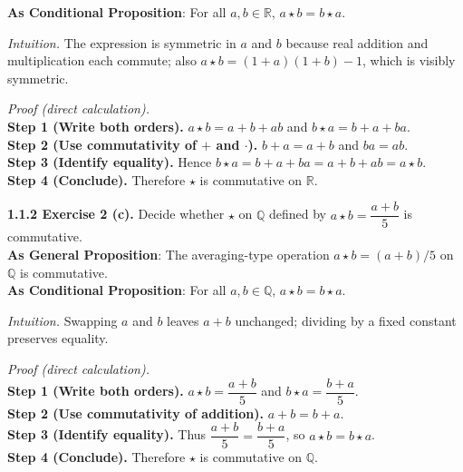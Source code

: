 \documentclass[12pt]{article}
\theoremstyle{definition}
\begin{document}
\noindent \textbf{As Conditional Proposition}: For all $a,b\in\mathbb{R}$, $a\star b=b\star a$.

\newpage

\dotfill

\emph{Intuition.} The expression is symmetric in $a$ and $b$ because real addition and multiplication each commute; also $a\star b=(1+a)(1+b)-1$, which is visibly symmetric.\\

\dotfill

\emph{Proof (direct calculation).}\\
\textbf{Step 1 (Write both orders).} $a\star b=a+b+ab$ and $b\star a=b+a+ba$.\\
\textbf{Step 2 (Use commutativity of $+$ and $\cdot$).} $b+a=a+b$ and $ba=ab$.\\
\textbf{Step 3 (Identify equality).} Hence $b\star a=b+a+ba=a+b+ab=a\star b$.\\
\textbf{Step 4 (Conclude).} Therefore $\star$ is commutative on $\mathbb{R}$.\\


\newpage

\noindent \textbf{1.1.2 Exercise 2 (c).} Decide whether $\star$ on $\mathbb{Q}$ defined by $a\star b=\dfrac{a+b}{5}$ is commutative.\\ %

\noindent\textbf{As General Proposition}: The averaging-type operation $a\star b=(a+b)/5$ on $\mathbb{Q}$ is commutative.\\

\noindent \textbf{As Conditional Proposition}: For all $a,b\in\mathbb{Q}$, $a\star b=b\star a$.

\newpage

\dotfill

\emph{Intuition.} Swapping $a$ and $b$ leaves $a+b$ unchanged; dividing by a fixed constant preserves equality.\\

\dotfill

\emph{Proof (direct calculation).}\\
\textbf{Step 1 (Write both orders).} $a\star b=\dfrac{a+b}{5}$ and $b\star a=\dfrac{b+a}{5}$.\\
\textbf{Step 2 (Use commutativity of addition).} $a+b=b+a$.\\
\textbf{Step 3 (Identify equality).} Thus $\dfrac{a+b}{5}=\dfrac{b+a}{5}$, so $a\star b=b\star a$.\\
\textbf{Step 4 (Conclude).} Therefore $\star$ is commutative on $\mathbb{Q}$.\\
\end{document}
